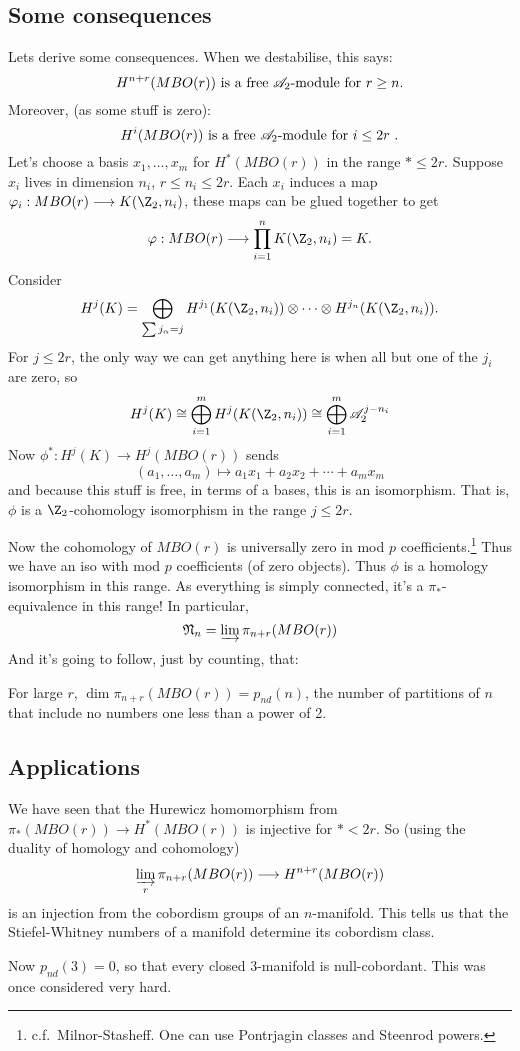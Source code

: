 \documentclass[11pt]{article}
\begin{document}
\begin{JeremyThomTalk}
\subsection*{Some consequences}
Lets derive some consequences. When we destabilise, this says:
\[H^{n+r}(MBO(r))\text{ is a free $\Steen$-module for $r\geq n$.}\]
Moreover, (as some stuff is zero):
\[H^{i}(MBO(r))\text{ is a free $\Steen$-module for $i\leq 2r$ .}\]
Let's choose a basis $x_1,\ldots,x_m$ for $H^*(MBO(r))$ in the range $*\leq 2r$.
Suppose $x_i$ lives in dimension $n_i$, $r\leq n_i\leq 2r$. Each $x_i$ induces a map $\phi_i:MBO(r)\to K(\Z_2,n_i)$, these maps can be glued together to get
\[\phi:MBO(r)\to \prod_{i=1}^n K(\Z_2,n_i)=K.\]
Consider
\[ H^j(K)=\bigoplus_{\sum j_\alpha=j}H^{j_1}(K(\Z_2,n_i))\otimes\cdots\otimes H^{j_n}(K(\Z_2,n_i)).\]
For $j\leq 2r$, the only way we can get anything here is when all but one of the $j_i$ are zero, so
\[H^j(K)\cong \bigoplus_{i=1}^m H^j(K(\Z_2,n_i))\cong \bigoplus_{i=1}^m \Steen^{j-n_i}\]
Now $\phi^*:H^j(K)\to H^j(MBO(r))$ sends
\[(a_1,\ldots,a_m)\mapsto a_1x_1+ a_2x_2+ \cdots+ a_mx_m\]
and because this stuff is free, in terms of a bases, this is an isomorphism. That is, $\phi$ is a $\Z_2$-cohomology isomorphism in the range $j\leq 2r$.

Now the cohomology of $MBO(r)$ is universally zero in mod $p$ coefficients.\footnote{c.f.\ Milnor-Stasheff. One can use Pontrjagin classes and Steenrod powers.}  Thus we have an iso with mod $p$ coefficients (of zero objects). Thus $\phi$ is a homology isomorphism in this range. As everything is simply connected, it's a $\pi_*$-equivalence in this range! In particular,
\[\frakN_n=\varinjlim \pi_{n+r}(MBO(r))\]
And it's going to follow, just by counting, that:
\begin{cor*}
For large $r$, $\dim \pi_{n+r}(MBO(r))=p_{nd}(n)$, the number of partitions of $n$ that include no numbers one less than a power of 2.
\end{cor*}
\subsection*{Applications}
We have seen that the Hurewicz homomorphism from $\pi_*(MBO(r))\to H^*(MBO(r))$ is injective for $\ast< 2r$. So (using the duality of homology and cohomology)
\[\varinjlim_r \pi_{n+r}(MBO(r))\to H^{n+r}(MBO(r))\]
is an injection from the cobordism groups of an $n$-manifold. This tells us that the Stiefel-Whitney numbers of a manifold determine its cobordism class.

Now $p_{nd}(3)=0$, so that every closed $3$-manifold is null-cobordant. This was once considered very hard.

\pagebreak
\end{JeremyThomTalk}
\end{document}
